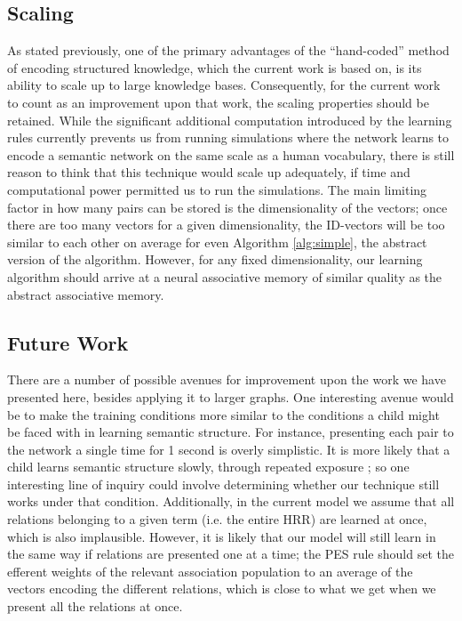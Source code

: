 \documentclass[10pt,letterpaper]{article}
\begin{document}
\subsection{Scaling}
As stated previously, one of the primary advantages of the ``hand-coded'' method of encoding structured knowledge, which the current work is based on, is its ability to scale up to large knowledge bases. Consequently, for the current work to count as an improvement upon that work, the scaling properties should be retained. While the significant additional computation introduced by the learning rules currently prevents us from running simulations where the network learns to encode a semantic network on the same scale as a human vocabulary, there is still reason to think that this technique would scale up adequately, if time and computational power permitted us to run the simulations. The main limiting factor in how many pairs can be stored is the dimensionality of the vectors; once there are too many vectors for a given dimensionality, the ID-vectors will be too similar to each other on average for even Algorithm \ref{alg:simple}, the abstract version of the algorithm. However, for any fixed dimensionality, our learning algorithm should arrive at a neural associative memory of similar quality as the abstract associative memory.

\subsection{Future Work}
There are a number of possible avenues for improvement upon the work we have presented here, besides applying it to larger graphs. One interesting avenue would be to make the training conditions more similar to the conditions a child might be faced with in learning semantic structure. For instance, presenting each pair to the network a single time for 1 second is overly simplistic. It is more likely that a child learns semantic structure slowly, through repeated exposure \citep{Deak}; so one interesting line of inquiry could involve determining whether our technique still works under that condition. Additionally, in the current model we assume that all relations belonging to a given term (i.e. the entire HRR) are learned at once, which is also implausible. However, it is likely that our model will still learn in the same way if relations are presented one at a time; the PES rule should set the efferent weights of the relevant association population to an average of the vectors encoding the different relations, which is close to what we get when we present all the relations at once.
\end{document}
